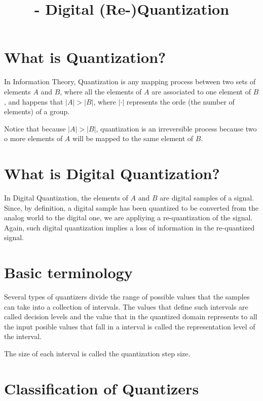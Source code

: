


\title{\SM{} - Digital (Re-)Quantization}

\maketitle

\tableofcontents

\section{What is Quantization?}

In Information Theory, Quantization is any mapping process between two
sets of elements $A$ and $B$, where all the elements of $A$ are
associated to one element of $B$, and happens that $|A|>|B|$, where
$|\cdot|$ represents the orde (the number of elements) of a group.

Notice that because $|A|>|B|$, quantization is an irreversible process
because two o more elements of $A$ will be mapped to the same element
of $B$.

\section{What is Digital Quantization?}

In Digital Quantization, the elements of $A$ and $B$ are digital
samples of a signal. Since, by definition, a digital sample has been
quantized to be converted from the analog world to the digital one, we
are appliying a re-quantization of the signal. Again, such digital
quantization implies a loss of information in the re-quantized signal.

\section{Basic terminology}

Several types of quantizers divide the range of possible values that
the samples can take into a collection of intervals. The values that
define such intervals are called decision levels and the value that in
the quantized domain represents to all the input posible values that
fall in a interval is called the representation level of the interval.

The size of each interval is called the quantization step size.

\section{Classification of Quantizers}

